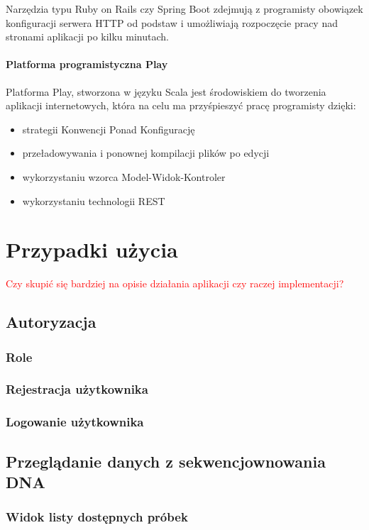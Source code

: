 \documentclass[a4paper,12pt,twoside]{article}
\begin{document}
Narzędzia typu Ruby on Rails czy Spring Boot 
zdejmują z programisty obowiązek konfiguracji serwera 
HTTP od podstaw i umożliwiają rozpoczęcie pracy  
nad stronami aplikacji po kilku minutach.

\paragraph{Platforma programistyczna Play}
Platforma Play, stworzona w języku Scala jest środowiskiem 
do tworzenia aplikacji internetowych, 
która na celu ma przyśpieszyć pracę programisty dzięki:
\begin{itemize}
\item strategii Konwencji Ponad Konfigurację
\item przeładowywania i ponownej kompilacji plików po edycji
\item wykorzystaniu wzorca Model-Widok-Kontroler
\item wykorzystaniu technologii REST
\end{itemize} 
  
\newpage
\section{Przypadki użycia}

\textcolor{red}{Czy skupić się bardziej na opisie działania aplikacji czy raczej implementacji?}

\subsection{Autoryzacja}
\subsubsection{Role}
\subsubsection{Rejestracja użytkownika}
\subsubsection{Logowanie użytkownika}

\subsection{Przeglądanie danych z sekwencjownowania DNA}
\subsubsection{Widok listy dostępnych próbek}
\end{document}
